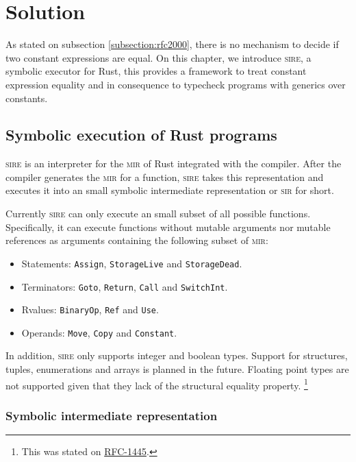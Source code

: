 \chapter{Solution}
\label{chapter:solution}

As stated on subsection \ref{subsection:rfc2000}, there is no mechanism to
decide if two constant expressions are equal. On this chapter,
we introduce \textsc{sire}, a symbolic executor for Rust, this provides a
framework to treat constant expression equality and in consequence to typecheck
programs with generics over constants. 

\section{Symbolic execution of Rust programs}

\textsc{sire} is an interpreter for the \textsc{mir} of Rust integrated with
the compiler. After the compiler generates the \textsc{mir}
for a function, \textsc{sire} takes this representation and executes it into
an small symbolic intermediate representation or \textsc{sir} for short.

Currently \textsc{sire} can only execute an small subset of all possible
functions. Specifically, it can execute functions without mutable arguments nor
mutable references as arguments containing the following subset of \textsc{mir}:

\begin{itemize}
    \item Statements: \texttt{Assign}, \texttt{StorageLive} and \texttt{StorageDead}.
    \item Terminators: \texttt{Goto}, \texttt{Return}, \texttt{Call} and \texttt{SwitchInt}.
    \item Rvalues: \texttt{BinaryOp}, \texttt{Ref} and \texttt{Use}.
    \item Operands: \texttt{Move}, \texttt{Copy} and \texttt{Constant}.
\end{itemize}

In addition, \textsc{sire} only supports integer and boolean types. Support for
structures, tuples, enumerations and arrays is planned in the future. Floating
point types are not supported given that they lack of the structural equality
property. \footnote{This was stated on
\href{https://github.com/rust-lang/rfcs/blob/master/text/1445-restrict-constants-in-patterns.md}{RFC-1445}.}


\subsection{Symbolic intermediate representation}

